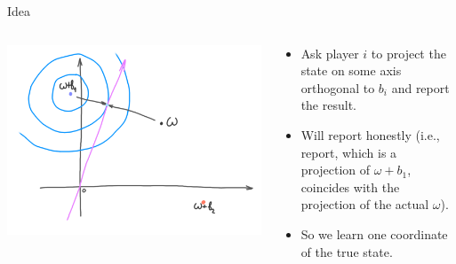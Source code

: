 \documentclass[english,10pt
,aspectratio=169
]{beamer}
\begin{document}
\begin{frame}{Idea}
	\begin{columns}
		\begin{column}{0.5\textwidth}
			\begin{center}
				\includegraphics[scale=0.65]{pics/M4/battaglini02.png}
			\end{center}
		\end{column}
		\begin{column}{0.5\textwidth}
			{\small
				\begin{itemize}
					\item Ask player $i$ to project the state on some axis orthogonal to $b_i$ and report the result.
					\item Will report honestly (i.e., report, which is a projection of $\omega +b_1$, coincides with the projection of the actual $\omega$).
					\item So we learn one coordinate of the true state.
				\end{itemize}
			}
		\end{column}
	\end{columns}
\end{frame}
\end{document}
